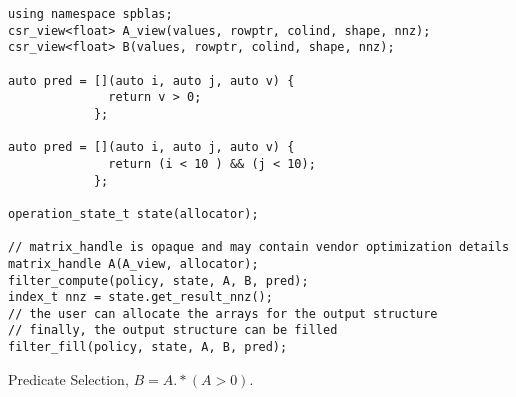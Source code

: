 \documentclass{article}
\begin{document}
\begin{listing}[H]
\begin{verbatim}
using namespace spblas;
csr_view<float> A_view(values, rowptr, colind, shape, nnz);
csr_view<float> B(values, rowptr, colind, shape, nnz);

auto pred = [](auto i, auto j, auto v) {
              return v > 0;
            };

auto pred = [](auto i, auto j, auto v) {
              return (i < 10 ) && (j < 10);
            };

operation_state_t state(allocator);
           
// matrix_handle is opaque and may contain vendor optimization details
matrix_handle A(A_view, allocator);
filter_compute(policy, state, A, B, pred);
index_t nnz = state.get_result_nnz();
// the user can allocate the arrays for the output structure
// finally, the output structure can be filled
filter_fill(policy, state, A, B, pred); 
\end{verbatim}
\caption{Predicate Selection, $B = A.*(A>0)$.}
\end{listing}






\newpage

\newpage




\begin{comment}
###########

// inspect (optional)
-> does nothing

//compute / compute__nnz
-> internally computes an upper bound to nnz, allocates internal memory, computes the SpGeMM

get_nnz
// user allocates CSR


//fill / extract / execute
-> copies over result from internal structure into user allocated CSR structure & deletes internal memory


###########

// inspect (optional)
-> does nothing

//compute / compute__nnz
-> only computes nnz

get_nnz
// user allocates CSR

//fill / extract / execute
-> computes the SpGeMM in the user allocated memory


if we split is up into symbolic/numeric part, we need two of each:
compute_symbolic
compute_numeric
fill_symbolic
fill_numeric


// state clearly that numeric zeros are stored
\end{comment}
\end{document}

